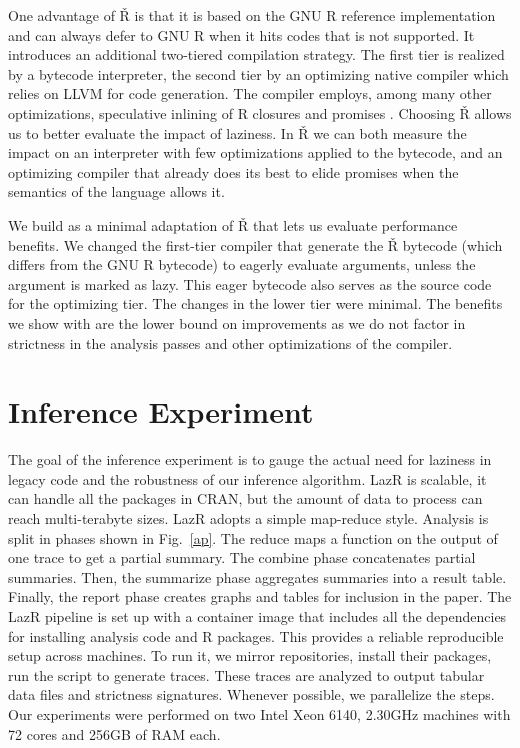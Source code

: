\documentclass[review,creen,acmsmall]{acmart}
\newcommand{\lazr}{{\sf LazR}\xspace}
\renewcommand{\Rsh}{{\sf\v R}\xspace}
\begin{document}
One advantage of \Rsh is that it is based on the GNU R reference implementation
and can always defer to GNU R when it hits codes that is not supported. It
introduces an additional two-tiered compilation strategy. The first tier is
realized by a bytecode interpreter, the second tier by an optimizing native
compiler which relies on LLVM for code generation. The compiler employs, among
many other optimizations, speculative inlining of R closures and promises
\citep{dls19, oopsla20c}.
Choosing \Rsh allows us to better evaluate the impact
of laziness. In \Rsh we can both measure the impact on an interpreter with few
optimizations applied to the bytecode, and an optimizing compiler that already
does its best to elide promises when the semantics of the language allows it.

We build \rshstrict as a minimal adaptation of \Rsh that lets us evaluate
performance benefits. We changed the first-tier compiler that generate the \Rsh
bytecode (which differs from the GNU R bytecode) to eagerly evaluate arguments,
unless the argument is marked as lazy. This eager bytecode also serves as the
source code for the optimizing tier.  The changes in the lower tier were minimal.
The benefits we show with \rshstrict are the lower bound on improvements as we
do not factor in strictness in the analysis passes and other optimizations of
the compiler.

\section{Inference Experiment}

The goal of the inference experiment is to gauge the actual need for
laziness in legacy code and the robustness of our inference algorithm.
\lazr is scalable, it can handle all the packages in CRAN, but the amount of
data to process can reach multi-terabyte sizes. \lazr adopts a simple map-reduce
style. Analysis is split in phases shown in Fig.~\ref{ap}. The reduce maps a
function on the output of one trace to get a partial summary. The combine phase
concatenates partial summaries. Then, the summarize phase aggregates summaries
into a result table. Finally, the report phase creates graphs and tables for
inclusion in the paper. The \lazr pipeline is set up with a container image that
includes all the dependencies for installing analysis code and R packages. This
provides a reliable reproducible setup across machines. To run it, we mirror
repositories, install their packages, run the script to generate traces.
These
traces are analyzed to output tabular data files and strictness signatures.
Whenever possible, we parallelize the steps. Our experiments were performed on
two Intel Xeon 6140, 2.30GHz machines with 72 cores and 256GB of RAM each.
\end{document}
